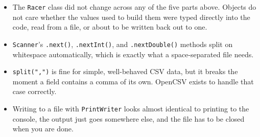 \documentclass[11pt]{article}
\begin{document}
\begin{itemize}[itemsep=2pt]
  \item The \texttt{Racer} class did not change across any of the
    five parts above. Objects do not care whether the values used to
    build them were typed directly into the code, read from a file,
    or about to be written back out to one.
  \item \texttt{Scanner}'s \texttt{.next()}, \texttt{.nextInt()}, and
    \texttt{.nextDouble()} methods split on whitespace automatically,
    which is exactly what a space-separated file needs.
  \item \texttt{split(",")} is fine for simple, well-behaved CSV data,
    but it breaks the moment a field contains a comma of its own.
    OpenCSV exists to handle that case correctly.
  \item Writing to a file with \texttt{PrintWriter} looks almost
    identical to printing to the console, the output just goes
    somewhere else, and the file has to be closed when you are done.
\end{itemize}

\end{document}
